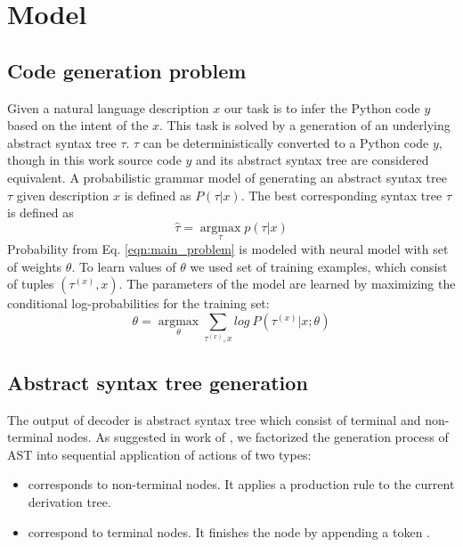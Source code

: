 \chapter{Model} 
\label{Chapter4}

\section{Code generation problem}
Given a natural language description $x$ our task is to infer the Python code $y$ based on the intent of the $x$. This task is solved by a generation of an underlying abstract syntax tree $\tau$. $\tau$ can be deterministically converted to a Python code $y$, though in this work source code $y$ and its abstract syntax tree are considered equivalent. A probabilistic grammar model of generating an abstract syntax tree $\tau$ given description $x$ is defined as $P(\tau|x)$. The best corresponding syntax tree $\tau$ is defined as
\begin{equation}
\hat{\tau}=\underset{\tau}{\operatorname{argmax}} p(\tau|x)
\label{eqn:main_problem}
\end{equation}
Probability from Eq. \ref{eqn:main_problem} is modeled with neural model with set of weights $\theta$. To learn values of $\theta$ we used set of training examples, which consist of tuples $(\tau^{(x)}, x)$. The parameters of the model are learned by maximizing the conditional log-probabilities for the training set:
\begin{equation}
\theta=\underset{\theta}{\operatorname{argmax}} \sum_{\tau^{(x)}, x} log \: P(\tau^{(x)}|x; \theta)
\label{eqn:mle}
\end{equation}

\section{Abstract syntax tree generation}
The output of decoder is abstract syntax tree which consist of terminal and non-terminal nodes. As suggested in work of \cite{Yin2017}, we factorized the generation process of AST into sequential application of actions of two types:
\begin{itemize}
	\item {} corresponds to non-terminal nodes. It applies a production rule  to the current derivation tree.
	\item {} correspond to terminal nodes. It finishes the node by appending a token .
\end{itemize}

